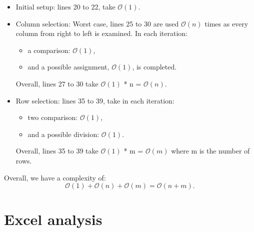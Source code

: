 \documentclass[a4paper]{article}
\numberwithin{equation}{section}
\begin{document}
\begin{itemize}
  \item Initial setup: lines 20 to 22, take $\mathcal{O}(1)$.
  \item Column selection: Worst case, lines 25 to 30 are used $\mathcal{O}(n)$ times as every column from right to left is examined. In each iteration:
  \begin{itemize}
    \item   a comparison:  $\mathcal{O}(1)$,
    \item and a possible assignment, $\mathcal{O}(1)$, is completed.

  \end{itemize}
    Overall, lines 27 to 30 take $\mathcal{O}(1)$ * n =  $\mathcal{O}(n)$.
  \item Row selection: lines 35 to 39, take in each iteration:
\begin{itemize}
\item  two comparison: $\mathcal{O}(1)$,
\item and a possible division: $\mathcal{O}(1)$.
\end{itemize}
    Overall, lines 35 to 39 take $\mathcal{O}(1)$ * m = $\mathcal{O}(m)$ where m is the number of rows.
\end{itemize}

  Overall, we have a complexity of:
\begin{equation}
    \label{eq:complexity_lc}
  \mathcal{O}(1) + \mathcal{O}(n) + \mathcal{O}(m) = \mathcal{O}(n + m).
\end{equation}


\section{Excel analysis}
\label{sec:excel}
\end{document}
